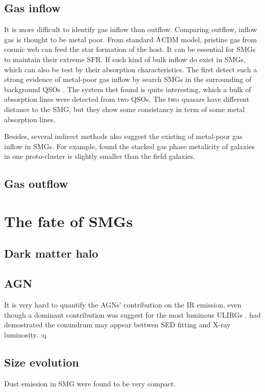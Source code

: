 \documentclass{astronotes/astronotes} %
\begin{document}
\subsection{Gas inflow}
It is more difficult to identify gas inflow than outflow.
Comparing outflow, inflow gas is thought to be metal poor.
From standard ${\rm \Lambda}$CDM model, pristine gas from cosmic web can feed the star formation of the host.
It can be essential for SMGs to maintain their extreme SFR.
If such kind of bulk inflow do exist in SMGs, which can also be test by their absorption characteristics.
The first detect such a strong evidence of metal-poor gas inflow by search SMGs in the surrounding of background QSOs \citep{Fu2021a}.
The system thet found is quite interesting, which a bulk of absorption lines were detected from two QSOs.
The two quasars have different distance to the SMG, but they show some consistancy in term of some metal absorption lines.

Besides, several indirect methods also suggest the existing of metal-poor gas inflow in SMGs.
For example, \citet{} found the stacked gas phase metalicity of galaxies in one proto-cluster is slightly smaller than the field galaxies.


\subsection{Gas outflow}



\section{The fate of SMGs}
\subsection{Dark matter halo}

\subsection{AGN}
It is very hard to quantify the AGNs' contribution on the IR emission, even though a dominant contribution was suggest for the most luminous ULIRGs \citep{Symeonidis2021}.
\citet{Ivison2019} had demostrated the conundrum may appear bettwen SED fitting and X-ray luminosity. :q

\subsection{Size evolution}
Dust emission in SMG were found to be very compact.
\end{document}
